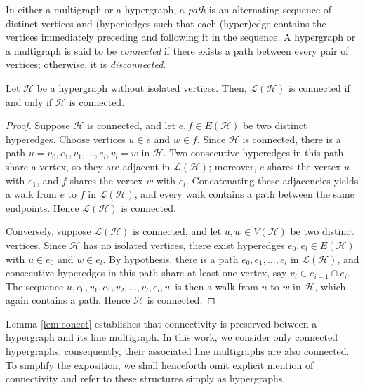 \documentclass[12pt,reqno]{amsart}
\begin{document}
\begin{definition}
In either a multigraph or a hypergraph, a \textit{path} is an alternating sequence of distinct vertices and (hyper)edges such that each (hyper)edge contains the vertices immediately preceding and following it in the sequence. A hypergraph or a multigraph is said to be \textit{connected} if there exists a path between every pair of vertices; otherwise, it is \textit{disconnected}.
\end{definition}


\begin{lemma}\label{lem:conect}
Let $\mathcal{H}$ be a hypergraph without isolated vertices. Then, $\mathcal{L}(\mathcal{H})$ is connected if and only if $\mathcal{H}$ is connected.
\end{lemma}
\begin{proof}
Suppose $\mathcal{H}$ is connected, and let $e, f \in E(\mathcal{H})$ be two distinct hyperedges. Choose vertices $u \in e$ and $w \in f$. Since $\mathcal{H}$ is connected, there is a path $u = v_0, e_1, v_1, \ldots, e_l, v_l = w$ in $\mathcal{H}$. Two consecutive hyperedges in this path share a vertex, so they are adjacent in $\mathcal{L}(\mathcal{H})$; moreover, $e$ shares the vertex $u$ with $e_1$, and $f$ shares the vertex $w$ with $e_l$. Concatenating these adjacencies yields a walk from $e$ to $f$ in $\mathcal{L}(\mathcal{H})$, and every walk contains a path between the same endpoints. Hence $\mathcal{L}(\mathcal{H})$ is connected.

Conversely, suppose $\mathcal{L}(\mathcal{H})$ is connected, and let $u, w \in V(\mathcal{H})$ be two distinct vertices. Since $\mathcal{H}$ has no isolated vertices, there exist hyperedges $e_0, e_l \in E(\mathcal{H})$ with $u \in e_0$ and $w \in e_l$. By hypothesis, there is a path $e_0, e_1, \ldots, e_l$ in $\mathcal{L}(\mathcal{H})$, and consecutive hyperedges in this path share at least one vertex, say $v_i \in e_{i-1} \cap e_i$. The sequence $u, e_0, v_1, e_1, v_2, \ldots, v_l, e_l, w$ is then a walk from $u$ to $w$ in $\mathcal{H}$, which again contains a path. Hence $\mathcal{H}$ is connected.
\end{proof}

Lemma \ref{lem:conect} establishes that connectivity is preserved between a hypergraph and its line multigraph. In this work, we consider only connected hypergraphs; consequently, their associated line multigraphs are also connected. To simplify the exposition, we shall henceforth omit explicit mention of connectivity and refer to these structures simply as hypergraphs.
\end{document}

